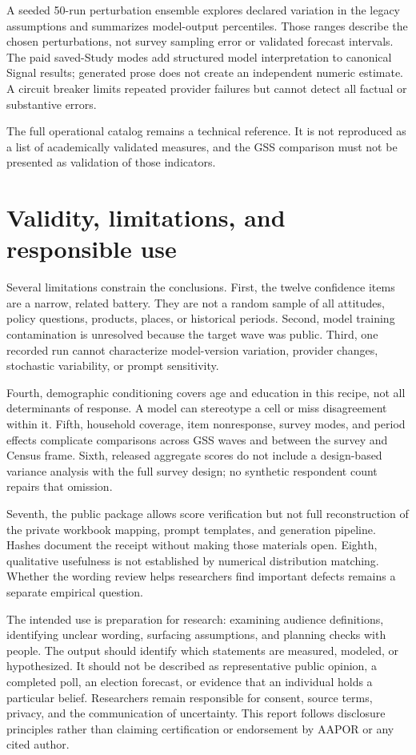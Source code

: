 \documentclass[
  11pt,
]{article}
\let\originalsection\section
\renewcommand{\section}{\Needspace{5\baselineskip}\originalsection}
\begin{document}
A seeded 50-run perturbation ensemble explores declared variation in the
legacy assumptions and summarizes model-output percentiles. Those ranges
describe the chosen perturbations, not survey sampling error or
validated forecast intervals. The paid saved-Study modes add structured
model interpretation to canonical Signal results; generated prose does
not create an independent numeric estimate. A circuit breaker limits
repeated provider failures but cannot detect all factual or substantive
errors.

The full operational catalog remains a technical reference. It is not
reproduced as a list of academically validated measures, and the GSS
comparison must not be presented as validation of those indicators.

\section{Validity, limitations, and responsible
use}\label{validity-limitations-and-responsible-use}

Several limitations constrain the conclusions. First, the twelve
confidence items are a narrow, related battery. They are not a random
sample of all attitudes, policy questions, products, places, or
historical periods. Second, model training contamination is unresolved
because the target wave was public. Third, one recorded run cannot
characterize model-version variation, provider changes, stochastic
variability, or prompt sensitivity.

Fourth, demographic conditioning covers age and education in this
recipe, not all determinants of response. A model can stereotype a cell
or miss disagreement within it. Fifth, household coverage, item
nonresponse, survey modes, and period effects complicate comparisons
across GSS waves and between the survey and Census frame. Sixth,
released aggregate scores do not include a design-based variance
analysis with the full survey design; no synthetic respondent count
repairs that omission.

Seventh, the public package allows score verification but not full
reconstruction of the private workbook mapping, prompt templates, and
generation pipeline. Hashes document the receipt without making those
materials open. Eighth, qualitative usefulness is not established by
numerical distribution matching. Whether the wording review helps
researchers find important defects remains a separate empirical
question.

The intended use is preparation for research: examining audience
definitions, identifying unclear wording, surfacing assumptions, and
planning checks with people. The output should identify which statements
are measured, modeled, or hypothesized. It should not be described as
representative public opinion, a completed poll, an election forecast,
or evidence that an individual holds a particular belief. Researchers
remain responsible for consent, source terms, privacy, and the
communication of uncertainty. This report follows disclosure principles
rather than claiming certification or endorsement by AAPOR or any cited
author.
\end{document}
